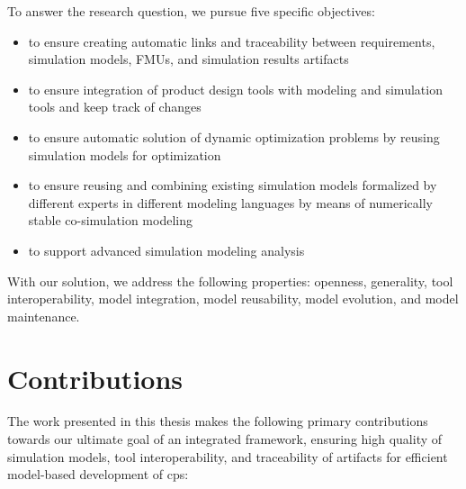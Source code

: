 To answer the research question, we pursue five specific objectives: 
\begin{itemize}

 \item to ensure creating automatic links and traceability between requirements, simulation models, FMUs, and simulation results artifacts 
 \item to ensure integration of product design tools with modeling and simulation tools and keep track of changes
 \item to ensure automatic solution of dynamic optimization problems by reusing simulation models for optimization 
 \item to ensure reusing and combining existing simulation models formalized by different experts in different modeling languages by means of numerically stable co-simulation modeling 
 \item to support advanced simulation modeling analysis 

\end{itemize}

With our solution, we address the following properties: openness, generality, tool interoperability, model integration, model reusability, model evolution, and model maintenance.

\section{Contributions}
\label{sec:Contributions}

The work presented in this thesis makes the following primary contributions towards our ultimate goal of an integrated framework, ensuring high quality of simulation models, tool interoperability, and traceability of artifacts for efficient model-based development of \acrshort{cps}:

